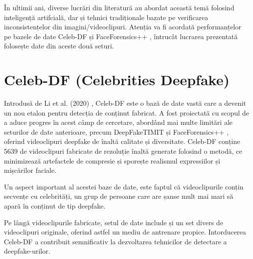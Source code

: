 În ultimii ani, diverse lucrări din literatură au abordat această temă folosind inteligență artifcială, dar și tehnici tradiționale bazate pe verificarea inconsistențelor din imagini/videoclipuri. Atenția va fi acordată performanțelor pe bazele de date Celeb-DF \cite{li2020celeb} și FaceForensics++ \cite{rössler2019faceforensics}, întrucât lucrarea prezentată folosește date din aceste două seturi.

\section{Celeb-DF (Celebrities Deepfake)}

Introdusă de Li et al. (2020) \cite{li2020celeb}, Celeb-DF este o bază de date vastă care a devenit un nou etalon pentru detecția de conținut fabricat. A fost proiectată cu scopul de a aduce progres în acest câmp de cercetare, abordând mai multe limitări ale seturilor de date anterioare, precum DeepFakeTIMIT \cite{khan2021adversarially} și FaceForensics++ \cite{rössler2019faceforensics}, oferind videoclipuri deepfake de înaltă calitate și diversitate. Celeb-DF conține 5639 de videoclipuri fabricate de rezoluție înaltă generate folosind o metodă, ce minimizează artefactele de compresie și sporește realismul expressiilor și mișcărilor faciale. 

Un aspect important al acestei baze de date, este faptul că videoclipurile conțin secvențe cu celebrități, un grup de persoane care are șanse mult mai mari să apară în conținut de tip deepfake.

Pe lângă videoclipurile fabricate, setul de date include și un set divers de videoclipuri originale, oferind astfel un mediu de antrenare propice. Intorducerea Celeb-DF a contribuit semnificativ la dezvoltarea tehnicilor de detectare a deepfake-urilor.

